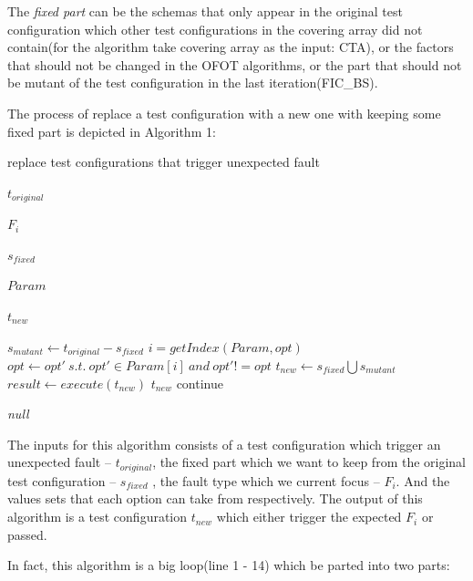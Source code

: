 \documentclass{sig-alternate}
\begin{document}
The \emph{fixed part} can be the schemas that only appear in the original test configuration which other test configurations in the covering array did not contain(for the algorithm take covering array as the input: CTA), or the factors that should not be changed in the OFOT algorithms, or the part that should not be mutant of the test configuration in the last iteration(FIC\_BS).

The process of replace a test configuration with a new one with keeping some fixed part is depicted in Algorithm 1:

\begin{algorithm}
  \caption{replace test configurations that trigger unexpected fault}
  \begin{algorithmic}[1]
     \Require

     $t_{original}$ 

     $F_{i}$ 

     $s_{fixed}$ 

     $Param$ 


     \Ensure  $t_{new}$ 

       \State $s_{mutant} \leftarrow t_{original} - s_{fixed}$
          \State $i = getIndex(Param,opt) $
          \State $opt \leftarrow opt' \ s.t.\ opt' \in Param[i]\ and\ opt' != opt$
       \EndFor
       \State $t_{new} \leftarrow s_{fixed} \bigcup s_{mutant} $
       \State $result \leftarrow execute(t_{new})$
         \State \Return $t_{new}$
       \Else
         \State continue
       \EndIf
     \EndWhile

     \State \Return \emph{null}
  \end{algorithmic}
\end{algorithm}

The inputs for this algorithm consists of a test configuration which trigger an unexpected fault -- $t_{original}$, the fixed part which we want to keep from the original test configuration -- $s_{fixed}$ , the fault type which we current focus -- $F_{i}$. And the values sets that each option can take from respectively.  The output of this algorithm is a test configuration $t_{new}$ which either trigger the expected $F_{i}$ or passed.

In fact, this algorithm is a big loop(line 1 - 14) which be parted into two parts:
\end{document}
